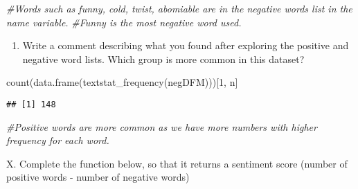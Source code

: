 \documentclass[
]{article}
\newenvironment{Shaded}{\begin{snugshade}}{\end{snugshade}}
\newcommand{\CommentTok}[1]{\textcolor[rgb]{0.56,0.35,0.01}{\textit{#1}}}
\newcommand{\DecValTok}[1]{\textcolor[rgb]{0.00,0.00,0.81}{#1}}
\newcommand{\FunctionTok}[1]{\textcolor[rgb]{0.00,0.00,0.00}{#1}}
\newcommand{\NormalTok}[1]{#1}
\newcommand{\StringTok}[1]{\textcolor[rgb]{0.31,0.60,0.02}{#1}}
\providecommand{\tightlist}{%
  \setlength{\itemsep}{0pt}\setlength{\parskip}{0pt}}
\begin{document}
\begin{Shaded}
\begin{Highlighting}[]
\CommentTok{\#Words such as funny, cold, twist, abomiable are in the negative words list in the name variable.}
\CommentTok{\#Funny is the most negative word used.}
\end{Highlighting}
\end{Shaded}

\begin{enumerate}
\def\labelenumi{\Alph{enumi}.}
\setcounter{enumi}{14}
\tightlist
\item
  Write a comment describing what you found after exploring the positive
  and negative word lists. Which group is more common in this dataset?
\end{enumerate}

\begin{Shaded}
\begin{Highlighting}[]
\FunctionTok{count}\NormalTok{(}\FunctionTok{data.frame}\NormalTok{(}\FunctionTok{textstat\_frequency}\NormalTok{(negDFM)))[}\DecValTok{1}\NormalTok{, }\StringTok{\textquotesingle{}n\textquotesingle{}}\NormalTok{]}
\end{Highlighting}
\end{Shaded}

\begin{verbatim}
## [1] 148
\end{verbatim}

\begin{Shaded}
\begin{Highlighting}[]
\CommentTok{\#Positive words are more common as we have more numbers with higher frequency for each word.}
\end{Highlighting}
\end{Shaded}

X. Complete the function below, so that it returns a sentiment score
(number of positive words - number of negative words)
\end{document}
